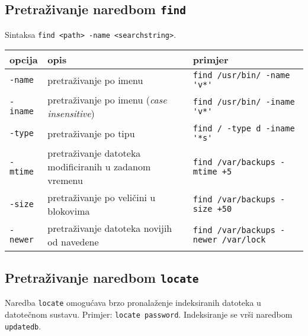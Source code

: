 \subsection*{Pretraživanje naredbom \texttt{find}}
Sintaksa \texttt{find <path> -name <searchstring>}.
\begin{center}
 
\begin{tabularx}{\textwidth}{lXl}
\toprule
opcija & opis & primjer\\
\midrule
\texttt{-name} &pretraživanje po imenu&\lstinline!find /usr/bin/ -name 'v*'!\\ \addlinespace
\texttt{-iname} &pretraživanje po imenu (\textit{case insensitive}) &\lstinline!find /usr/bin/ -iname 'v*'!\\ \addlinespace
\texttt{-type} &pretraživanje po tipu&\lstinline!find / -type d -iname '*s'!\\  \addlinespace
\texttt{-mtime} &pretraživanje datoteka modificiranih u zadanom vremenu&\lstinline!find /var/backups -mtime +5!\\ \addlinespace
\texttt{-size} &pretraživanje po veličini u blokovima&\lstinline!find /var/backups -size +50!\\ \addlinespace
\texttt{-newer} &pretraživanje datoteka novijih od navedene&\lstinline!find /var/backups -newer /var/lock!\\ 
\bottomrule
\end{tabularx}

\end{center}

\subsection*{Pretraživanje naredbom \texttt{locate}}

Naredba \texttt{locate} omogućava brzo pronalaženje indeksiranih datoteka u datotečnom sustavu. Primjer: \lstinline!locate password!. Indeksiranje se vrši naredbom \lstinline!updatedb!.

